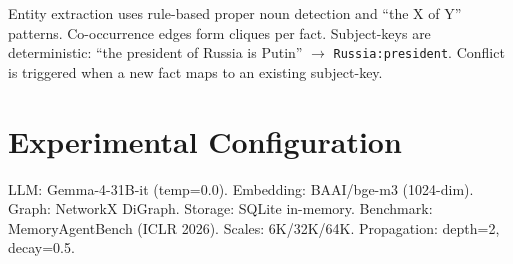 \documentclass{article}
\begin{document}
Entity extraction uses rule-based proper noun detection and ``the X of Y'' patterns.
Co-occurrence edges form cliques per fact.
Subject-keys are deterministic: ``the president of Russia is Putin'' $\rightarrow$ \texttt{Russia:president}.
Conflict is triggered when a new fact maps to an existing subject-key.

\section{Experimental Configuration}
\label{app:config}

LLM: Gemma-4-31B-it (temp=0.0). Embedding: BAAI/bge-m3 (1024-dim). Graph: NetworkX DiGraph. Storage: SQLite in-memory. Benchmark: MemoryAgentBench (ICLR 2026). Scales: 6K/32K/64K. Propagation: depth=2, decay=0.5.
\end{document}
